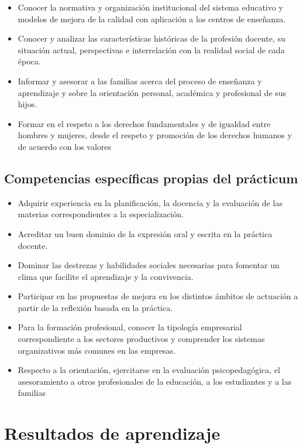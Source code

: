 \documentclass[12pt,a4paper]{article}
\begin{document}
\begin{itemize}
  \item Conocer la normativa y organización institucional del sistema educativo y modelos de mejora de la calidad con aplicación a los centros de enseñanza.
  \item Conocer y analizar las características históricas de la profesión docente, su situación actual, perspectivas e interrelación con la realidad social de cada época.
  \item Informar y asesorar a las familias acerca del proceso de enseñanza y aprendizaje y sobre la orientación personal, académica y profesional de sus hijos.
  \item Formar en el respeto a los derechos fundamentales y de igualdad entre hombres y mujeres, desde el respeto y promoción de los derechos humanos y de acuerdo con los valores
\end{itemize}

\subsection{Competencias específicas propias del prácticum}\label{subsec:competencias_especificas}

\begin{itemize}
  \item Adquirir experiencia en la planificación, la docencia y la evaluación de las materias correspondientes a la especialización.
  \item Acreditar un buen dominio de la expresión oral y escrita en la práctica docente.
  \item Dominar las destrezas y habilidades sociales necesarias para fomentar un clima que facilite el aprendizaje y la convivencia.
  \item Participar en las propuestas de mejora en los distintos ámbitos de actuación a partir de la reflexión basada en la práctica.
  \item Para la formación profesional, conocer la tipología empresarial correspondiente a los sectores productivos y comprender los sistemas organizativos más comunes en las empresas.
  \item Respecto a la orientación, ejercitarse en la evaluación psicopedagógica, el asesoramiento a otros profesionales de la educación, a los estudiantes y a las familias
\end{itemize}

\section{Resultados de aprendizaje}\label{subsec:ras}
\end{document}
